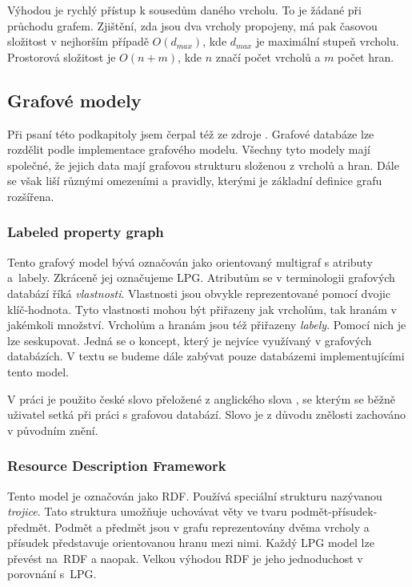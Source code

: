 \documentclass[
  program=infoi,
  biblatex=true,
  figures=true,
  glossaries=false,
  index,
  sourcecodes=true
]{kidiplom}
\begin{document}
Výhodou je rychlý přístup k sousedům daného vrcholu. To je žádané při průchodu grafem. Zjištění, zda jsou dva vrcholy propojeny, má pak časovou složitost v nejhorším případě $O(d_{max})$, kde $d_{max}$ je maximální stupeň vrcholu. Prostorová složitost je $O(n + m)$, kde $n$ značí počet vrcholů a $m$ počet hran.

\subsection{Grafové modely}
Při psaní této podkapitoly jsem čerpal též ze zdroje \cite{graphModels}. Grafové databáze lze rozdělit podle implementace grafového modelu. Všechny tyto modely mají společné, že jejich data mají grafovou strukturu složenou z vrcholů a hran. Dále se však liší různými omezeními a pravidly, kterými je základní definice grafu rozšířena.

\subsubsection{Labeled property graph}
Tento grafový model bývá označován jako orientovaný multigraf s atributy a~labely. Zkráceně jej označujeme LPG. Atributům se v terminologii grafových databází říká \textit{vlastnosti}. Vlastnosti jsou obvykle reprezentované pomocí dvojic klíč-hodnota. Tyto vlastnosti mohou být přiřazeny jak vrcholům, tak hranám v jakémkoli množství. Vrcholům a hranám jsou též přiřazeny \textit{labely}. Pomocí nich je lze seskupovat. Jedná se o koncept, který je nejvíce využívaný v grafových databázích. V textu se budeme dále zabývat pouze databázemi implementujícími tento model.

\begin{remark}[Překlad]
V práci je použito  české slovo  přeložené z anglického slova , se kterým se běžně uživatel setká při práci s grafovou databází. Slovo  je z důvodu znělosti zachováno v původním znění.
\end{remark}

\subsubsection{Resource Description Framework}
Tento model je označován jako RDF. Používá speciální strukturu nazývanou \textit{trojice}. Tato struktura umožňuje uchovávat věty ve tvaru podmět-přísudek-předmět. Podmět a předmět jsou v grafu reprezentovány dvěma vrcholy a přísudek představuje orientovanou hranu mezi nimi. \cite{rdf} Každý LPG model lze převést na~RDF a naopak. Velkou výhodou RDF je jeho jednoduchost v porovnání s~LPG.
\end{document}
